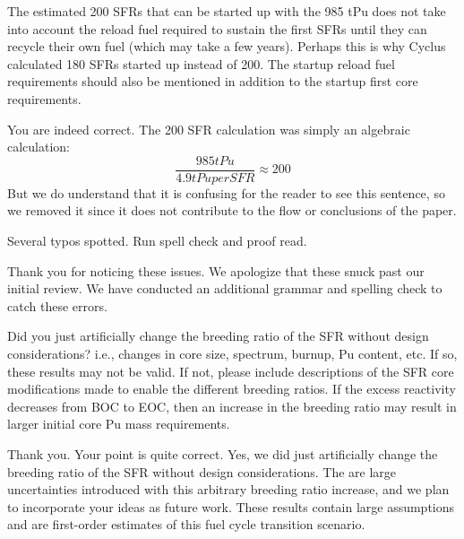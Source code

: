 \documentclass[answers,11pt]{exam}
\begin{document}
\begin{questions}
        \question The estimated 200 SFRs that can be started up with the 985 
        tPu does not take into account the reload fuel required to sustain the 
        first SFRs until they can recycle their own fuel (which may take a few 
        years). Perhaps this is why Cyclus calculated 180 SFRs started up 
        instead of 200. The startup reload fuel requirements should also be 
        mentioned in addition to the startup first core requirements.
        \begin{solution}
                You are indeed correct. The 200 SFR calculation was
                simply an algebraic calculation:
                \[ \frac{985 tPu}{4.9 tPu per SFR} \approx 200 \]
                But we do understand that it is confusing for the reader
                to see this sentence, so we removed it since it does not
                contribute to the flow or conclusions of the paper.
        \end{solution}

        \question Several typos spotted. Run spell check and proof read.

        \begin{solution}
                Thank you for noticing these issues. We apologize that these 
                snuck past our initial review. We have conducted an additional
                grammar and spelling check to catch these errors.
        \end{solution}

        \question Did you just artificially change the breeding ratio of the 
        SFR without design considerations?  i.e., changes in core size, 
        spectrum, burnup, Pu content, etc. If so, these results may not be 
        valid.  If not, please include descriptions of the SFR core 
        modifications made to enable the different breeding ratios. If the 
        excess reactivity decreases from BOC to EOC, then an increase in the 
        breeding ratio may result in larger initial core Pu mass requirements.
        \begin{solution}
                Thank you. Your point is quite correct. 
                Yes, we did just artificially change
                the breeding ratio of the SFR without design considerations.
                The are large uncertainties introduced with this arbitrary
                breeding ratio increase, and we plan to incorporate your
                ideas as future work. These results contain large assumptions
                and are first-order estimates of this fuel cycle transition
                scenario.
        \end{solution}


\end{questions}
\end{document}

